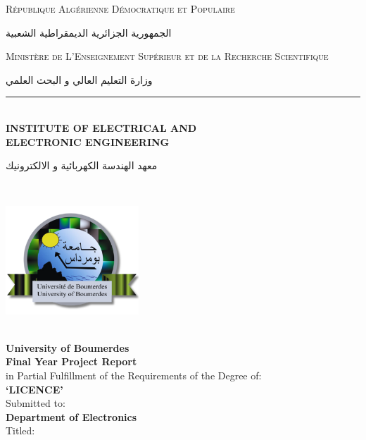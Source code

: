 \documentclass[a4paper]{report}
\begin{document}
\renewcommand{\refname}{Webliography}
\renewcommand{\bibname}{Webliography}
\begin{titlepage}
    \centering
    {\textsc{{\small République Algérienne Démocratique et Populaire}}}\\
    \begin{Arabic}
    {\large الجمهورية الجزائرية الديمقراطية الشعبية}\\
	\end{Arabic}
    {\textsc{\small Ministère de L'Enseignement Supérieur et de la Recherche Scientifique}}\\
        \begin{Arabic}
        \large {وزارة التعليم العالي و البحث العلمي} \\
	\end{Arabic}
\rule{\linewidth}{0.3mm} \\[0.4cm]
\textbf{\small {INSTITUTE OF ELECTRICAL AND \\ELECTRONIC ENGINEERING}}\\
\begin{Arabic}
    \normalsize{معهد الهندسة الكهربائية و الالكترونيك}
\end{Arabic}\\
\begin{minipage}{5cm}
	\begin{center}
		\includegraphics[width=5cm]{umbb2.png}
	\end{center}
\end{minipage}
\\\textbf{University of Boumerdes}\\
\vspace{10mm}
{\large \bfseries Final Year Project Report}\\[0.5cm]
{\large in Partial Fulfillment of the Requirements
of the Degree of:\\
\textbf{‘LICENCE’}}\\[0.5cm]
{\large Submitted to:\\ \vspace{0.5cm}
\bfseries{Department of Electronics}}\\
\vspace{5mm}
{\large Titled:\\
{\Large \bfseries{}}\\

}
\end{titlepage}
\end{document}
